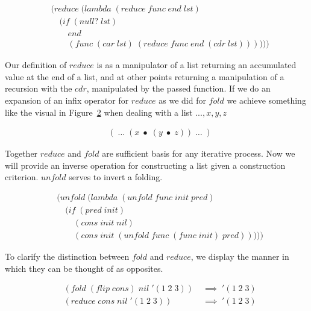 \begin{figure}[htp]
\caption{}\label{fig:reduceDef}
\begin{align*}
& (reduce \; (lambda \; (reduce \; func \; end \; lst)
\\& \quad (if \; (null? \; lst)
\\& \qquad end
\\& \qquad (func \; (car \; lst) \; (reduce \; func \; end \; (cdr \; lst))))))
\end{align*}
\end{figure}

Our definition of $reduce$ is as a manipulator of a list returning an
accumulated value at the end of a list, and at other points returning a
manipulation of a recursion with the $cdr$, manipulated by the passed function.
If we do an expansion of an infix operator for $reduce$ as we did for $fold$ we
achieve something like the visual in Figure~\ref{fig:reduceVisual} when dealing
with a list $... , x, y, z$

\begin{figure}[htp]
\caption{}\label{fig:reduceVisual}
\begin{align*}
& ( \; \dots \; (x \; \bullet \; (y \; \bullet \; z)) \; \dots \; )
\end{align*}
\end{figure}

Together $reduce$ and $fold$ are sufficient basis for any iterative process. Now 
we will provide an inverse operation for constructing a list given a construction 
criterion. $unfold$ serves to invert a folding.

\begin{figure}[htp]
\caption{}\label{fig:unfoldDef}
\begin{align*}
& (unfold \; (lambda \; (unfold \; func \; init \; pred)
\\& \quad (if \; (pred \; init)
\\& \qquad (cons \; init \; nil)
\\& \qquad (cons \; init \; (unfold \; func \; (func \; init) \; pred)))))
\end{align*}
\end{figure}

To clarify the distinction between $fold$ and $reduce$, we display the manner in 
which they can be thought of as opposites.

\begin{figure}[htp]
\caption{}\label{fig:foldVsReduce}
\begin{align*}
& (fold \; (flip \; cons) \; nil \; '(1 \; 2 \; 3)) \; &\implies \; '(1 \; 2 \; 3)
\\& (reduce \; cons \; nil \; '(1 \; 2 \; 3)) \; &\implies \; '(1 \; 2 \; 3)
\end{align*}
\end{figure}

